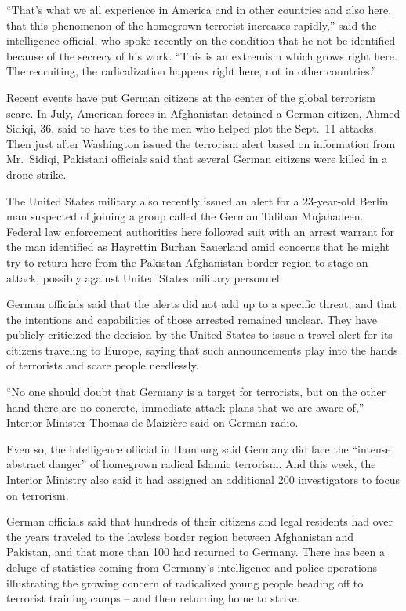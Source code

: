 ﻿\documentclass[12pt]{article}
\begin{document}
``That's what we all experience in America and in other countries and also here, that this
phenomenon of the homegrown terrorist increases rapidly,'' said the intelligence official, who spoke
recently on the condition that he not be identified because of the secrecy of his work. ``This is an
extremism which grows right here. The recruiting, the radicalization happens right here, not in
other countries.''

Recent events have put German citizens at the center of the global terrorism scare. In July,
American forces in Afghanistan detained a German citizen, Ahmed Sidiqi, 36, said to have ties to the
men who helped plot the Sept.~11 attacks. Then just after Washington issued the terrorism alert
based on information from Mr.~Sidiqi, Pakistani officials said that several German citizens were
killed in a drone strike.

The United States military also recently issued an alert for a 23-year-old Berlin man suspected of
joining a group called the German Taliban Mujahadeen. Federal law enforcement authorities here
followed suit with an arrest warrant for the man identified as Hayrettin Burhan Sauerland amid
concerns that he might try to return here from the Pakistan-Afghanistan border region to stage an
attack, possibly against United States military personnel.

German officials said that the alerts did not add up to a specific threat, and that the intentions
and capabilities of those arrested remained unclear. They have publicly criticized the decision by
the United States to issue a travel alert for its citizens traveling to Europe, saying that such
announcements play into the hands of terrorists and scare people needlessly.

``No one should doubt that Germany is a target for terrorists, but on the other hand there are no
concrete, immediate attack plans that we are aware of,'' Interior Minister Thomas de Maizi\`ere said
on German radio.

Even so, the intelligence official in Hamburg said Germany did face the ``intense abstract danger''
of homegrown radical Islamic terrorism. And this week, the Interior Ministry also said it had
assigned an additional 200 investigators to focus on terrorism.

German officials said that hundreds of their citizens and legal residents had over the years
traveled to the lawless border region between Afghanistan and Pakistan, and that more than 100 had
returned to Germany. There has been a deluge of statistics coming from Germany's intelligence and
police operations illustrating the growing concern of radicalized young people heading off to
terrorist training camps -- and then returning home to strike.
\end{document}
